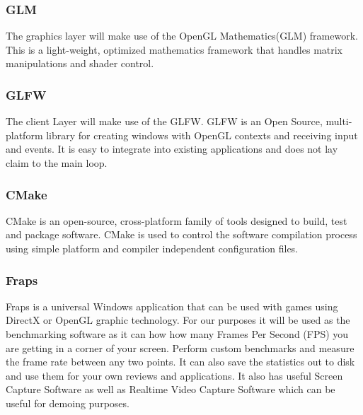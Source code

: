 \documentclass[11pt]{article}
\begin{document}
\subsubsection{GLM}
The graphics layer will make use of the OpenGL Mathematics(GLM) framework. This is a light-weight, optimized mathematics framework that handles matrix manipulations and shader control.
\subsubsection{GLFW}
The client Layer will make use of the GLFW. GLFW is an Open Source, multi-platform library for creating windows with OpenGL contexts and receiving input and events. It is easy to integrate into existing applications and does not lay claim to the main loop.
\subsubsection{CMake}
CMake is an open-source, cross-platform family of tools designed to build, test and package software. CMake is used to control the software compilation process using simple platform and compiler independent configuration files.
\subsubsection{Fraps}
Fraps is a universal Windows application that can be used with games using DirectX or OpenGL graphic technology. For our purposes it will be used as the benchmarking software as it can how how many Frames Per Second (FPS) you are getting in a corner of your screen.  Perform custom benchmarks and measure the frame rate between any two points. It can also save the statistics out to disk and use them for your own reviews and applications. It also has useful Screen Capture Software as well as Realtime Video Capture Software which can be useful for demoing purposes.
\end{document}
